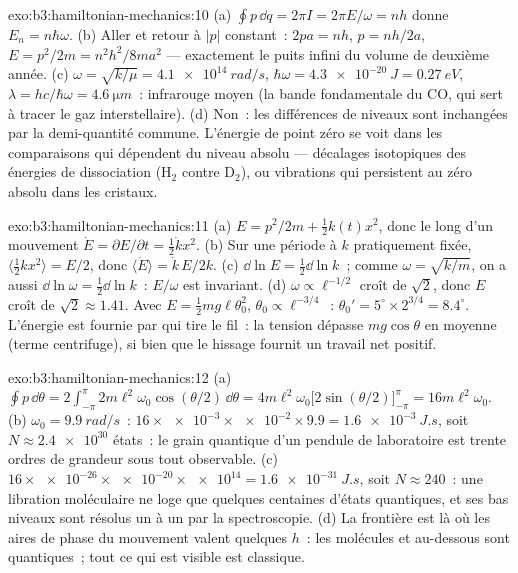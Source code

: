 \begin{solution}{exo:b3:hamiltonian-mechanics:10}
(a) $\oint p\,\dd q = 2\pi I = 2\pi E/\omega = nh$ donne $E_n =
n\hbar\omega$. (b) Aller et retour à $|p|$ constant~: $2pa = nh$, $p =
nh/2a$, $E = p^2/2m = n^2h^2/8ma^2$ --- exactement le puits infini du
volume de deuxième année. (c) $\omega = \sqrt{k/\mu} = \qty{4.1e14}{rad/s}$,
$\hbar\omega = \qty{4.3e-20}{J} = \qty{0.27}{eV}$, $\lambda = hc/
\hbar\omega = \qty{4.6}{\micro m}$~: infrarouge moyen (la bande
fondamentale du CO, qui sert à tracer le gaz interstellaire). (d) Non~:
les différences de niveaux sont inchangées par la demi-quantité
commune. L'énergie de point zéro se voit dans les comparaisons qui
dépendent du niveau absolu --- décalages isotopiques des énergies de
dissociation (H$_2$ contre D$_2$), ou vibrations qui persistent au
zéro absolu dans les cristaux.
\end{solution}

\begin{solution}{exo:b3:hamiltonian-mechanics:11}
(a) $E = p^2/2m + \tfrac12 k(t)x^2$, donc le long d'un mouvement $\dot E =
\partial E/\partial t = \tfrac12\dot kx^2$. (b) Sur une période à $k$
pratiquement fixée, $\langle\tfrac12 kx^2\rangle = E/2$, donc
$\langle\dot E\rangle = \dot k\,E/2k$. (c) $\dd\ln E = \tfrac12\dd\ln
k$~; comme $\omega = \sqrt{k/m}$, on a aussi $\dd\ln\omega = \tfrac12\dd\ln k$~:
$E/\omega$ est invariant. (d) $\omega \propto \ell^{-1/2}$ croît
de $\sqrt2$, donc $E$ croît de $\sqrt2 \approx 1.41$. Avec $E = \tfrac12
mg\ell\theta_0^2$, $\theta_0 \propto \ell^{-3/4}$~: $\theta_0' =
5^\circ \times 2^{3/4} = 8.4^\circ$. L'énergie est fournie par qui
tire le fil~: la tension dépasse $mg\cos\theta$ en moyenne (terme
centrifuge), si bien que le hissage fournit un travail net positif.
\end{solution}

\begin{solution}{exo:b3:hamiltonian-mechanics:12}
(a) $\oint p\,\dd\theta = 2\int_{-\pi}^{\pi}2m\ell^2\omega_0
\cos(\theta/2)\,\dd\theta = 4m\ell^2\omega_0\big[2\sin(\theta/2)
\big]_{-\pi}^{\pi} = 16m\ell^2\omega_0$. (b) $\omega_0 =
\qty{9.9}{rad/s}$~: $16 \times \num{e-3} \times \num{e-2} \times 9.9 =
\qty{1.6e-3}{J.s}$, soit $N \approx \num{2.4e30}$ états~: le grain
quantique d'un pendule de laboratoire est trente ordres de grandeur
sous tout observable. (c) $16 \times \num{e-26} \times
\num{e-20} \times \num{e14} = \qty{1.6e-31}{J.s}$, soit $N \approx
240$~: une libration moléculaire ne loge que quelques centaines
d'états quantiques, et ses bas niveaux sont résolus un à un par la
spectroscopie. (d) La frontière est là où les aires de phase du
mouvement valent quelques $h$~: les molécules et au-dessous sont
quantiques~; tout ce qui est visible est classique.
\end{solution}

